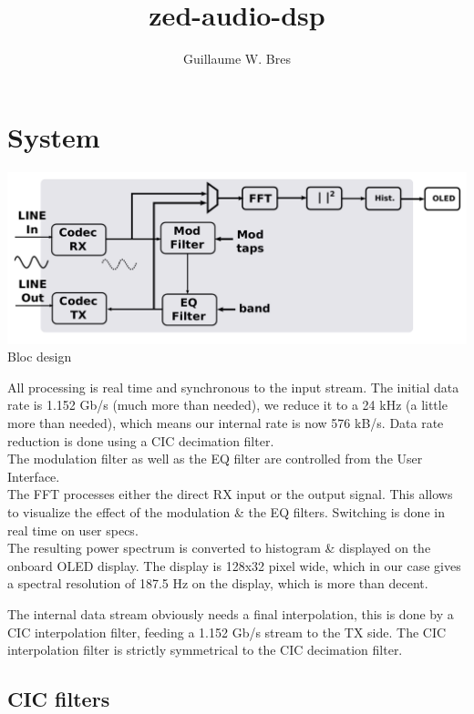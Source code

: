 \documentclass{article}
\author{Guillaume W. Bres}
\title{zed-audio-dsp}
\begin{document}
\maketitle
\tableofcontents

\newpage
\section{System}

\begin{center}
	\includegraphics[width=0.75\linewidth]{bloc_design.pdf} \\
	Bloc design
\end{center}

All processing is real time and synchronous to the input
stream. The initial data rate is 1.152 Gb/s (much more than needed),
we reduce it to a 24 kHz (a little more than needed),
which means our internal rate is now 576 kB/s.
Data rate reduction is done using a CIC decimation filter. \\

The modulation filter as well as the
EQ filter are controlled from the User Interface. \\

The FFT processes either the
direct RX input or the output signal.
This allows to visualize the effect
of the modulation \& the EQ filters.
Switching is done in real time on user specs. \\

The resulting power spectrum is converted to histogram
\& displayed on the onboard OLED display.
The display is 128x32 pixel wide, which in our case
gives a spectral resolution of 187.5 Hz
on the display, which is more than decent.

The internal data stream obviously needs a final
interpolation, this is done by a CIC interpolation
filter, feeding a 1.152 Gb/s stream to the TX side.
The CIC interpolation filter is strictly symmetrical
to the CIC decimation filter.

\newpage
\subsection{CIC filters}
\end{document}
